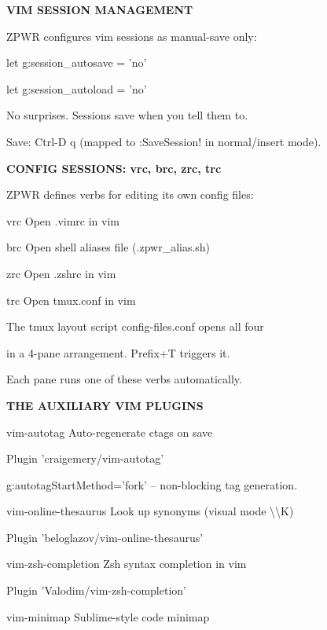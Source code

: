 \documentclass[11pt,a4paper,twoside]{book}
\begin{document}
\vspace{12pt}
{\bfseries\color{neonyellow} VIM SESSION MANAGEMENT}\vspace{4pt}

ZPWR configures vim sessions as manual-save only:

let g:session\_autosave = 'no'

let g:session\_autoload = 'no'

No surprises. Sessions save when you tell them to.

\begin{codebox}
Save: Ctrl-D q (mapped to :SaveSession! in normal/insert mode).\\
\end{codebox}


\vspace{12pt}
{\bfseries\color{neonyellow} CONFIG SESSIONS: vrc, brc, zrc, trc}\vspace{4pt}

ZPWR defines verbs for editing its own config files:

vrc   Open .vimrc in vim

brc   Open shell aliases file (.zpwr\_alias.sh)

zrc   Open .zshrc in vim

trc   Open tmux.conf in vim

The tmux layout script config-files.conf opens all four

in a 4-pane arrangement. Prefix+T triggers it.

Each pane runs one of these verbs automatically.


\vspace{12pt}
{\bfseries\color{neonyellow} THE AUXILIARY VIM PLUGINS}\vspace{4pt}

vim-autotag           Auto-regenerate ctags on save

Plugin 'craigemery/vim-autotag'

g:autotagStartMethod='fork' -- non-blocking tag generation.

vim-online-thesaurus   Look up synonyms (visual mode \textbackslash{}\textbackslash{}K)

Plugin 'beloglazov/vim-online-thesaurus'

vim-zsh-completion     Zsh syntax completion in vim

Plugin 'Valodim/vim-zsh-completion'

vim-minimap            Sublime-style code minimap
\end{document}
